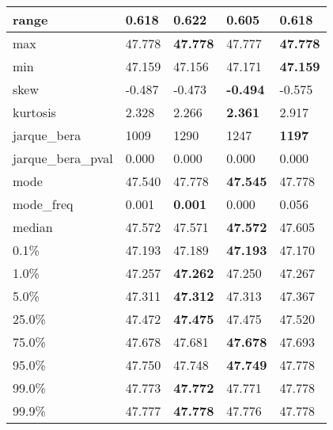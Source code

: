 \begin{table}[H]
\begin{tabular}{|l|m{10em}|m{10em}|m{10em}|m{10em}|}
\hline range & 0.618 & 0.622 & \cellcolor[rgb]{0.9, 0.54, 0.52} 0.605 & \bfseries 0.618 \\
\hline max & 47.778 & \bfseries 47.778 & \cellcolor[rgb]{0.9, 0.54, 0.52} 47.777 & \bfseries 47.778 \\
\hline min & 47.159 & 47.156 & \cellcolor[rgb]{0.9, 0.54, 0.52} 47.171 & \bfseries 47.159 \\
\hline skew & -0.487 & -0.473 & \bfseries -0.494 & \cellcolor[rgb]{0.9, 0.54, 0.52} -0.575 \\
\hline kurtosis & 2.328 & 2.266 & \bfseries 2.361 & \cellcolor[rgb]{0.9, 0.54, 0.52} 2.917 \\
\hline jarque\_bera & 1009 & \cellcolor[rgb]{0.9, 0.54, 0.52} 1290 & 1247 & \bfseries 1197 \\
\hline jarque\_bera\_pval & 0.000 & 0.000 & 0.000 & 0.000 \\
\hline mode & 47.540 & \cellcolor[rgb]{0.9, 0.54, 0.52} 47.778 & \bfseries 47.545 & \cellcolor[rgb]{0.9, 0.54, 0.52} 47.778 \\
\hline mode\_freq & 0.001 & \bfseries 0.001 & 0.000 & \cellcolor[rgb]{0.9, 0.54, 0.52} 0.056 \\
\hline median & 47.572 & 47.571 & \bfseries 47.572 & \cellcolor[rgb]{0.9, 0.54, 0.52} 47.605 \\
\hline 0.1\% & 47.193 & 47.189 & \bfseries 47.193 & \cellcolor[rgb]{0.9, 0.54, 0.52} 47.170 \\
\hline 1.0\% & 47.257 & \bfseries 47.262 & 47.250 & \cellcolor[rgb]{0.9, 0.54, 0.52} 47.267 \\
\hline 5.0\% & 47.311 & \bfseries 47.312 & 47.313 & \cellcolor[rgb]{0.9, 0.54, 0.52} 47.367 \\
\hline 25.0\% & 47.472 & \bfseries 47.475 & 47.475 & \cellcolor[rgb]{0.9, 0.54, 0.52} 47.520 \\
\hline 75.0\% & 47.678 & 47.681 & \bfseries 47.678 & \cellcolor[rgb]{0.9, 0.54, 0.52} 47.693 \\
\hline 95.0\% & 47.750 & 47.748 & \bfseries 47.749 & \cellcolor[rgb]{0.9, 0.54, 0.52} 47.778 \\
\hline 99.0\% & 47.773 & \bfseries 47.772 & 47.771 & \cellcolor[rgb]{0.9, 0.54, 0.52} 47.778 \\
\hline 99.9\% & 47.777 & \bfseries 47.778 & \cellcolor[rgb]{0.9, 0.54, 0.52} 47.776 & 47.778 \\
\hline
\end{tabular}
\end{table}
